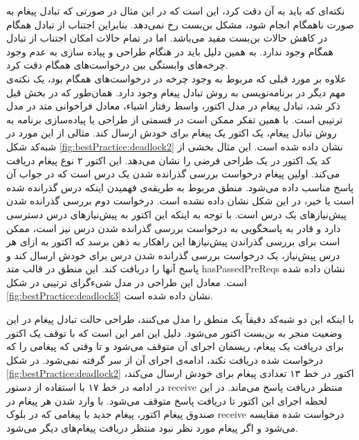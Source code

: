 \begin{enumerate}
نکته‌ای که باید به آن دقت کرد، این است که در این مثال در صورتی که تبادل پیغام به صورت ناهمگام انجام شود، مشکل بن‌بست رخ نمی‌دهد. بنابراین اجتناب از تبادل همگام در کاهش حالات بن‌بست مفید می‌باشد. اما در تمام حالات امکان اجتناب از تبادل همگام وجود ندارد. به همین دلیل باید در هنگام طراحی و پیاده سازی به عدم وجود چرخه‌های وابستگی بین درخواست‌های همگام دقت کرد. \\
علاوه بر مورد قبلی که مربوط به وجود چرخه در درخواست‌های همگام بود، یک نکته‌ی مهم دیگر در برنامه‌نویسی به روش تبادل پیغام وجود دارد. همان‌طور که در بخش قبل ذکر شد، تبادل پیغام در مدل اکتور، واسط رفتار اشیاء، معادل فراخوانی متد در مدل ترتیبی است. با همین تفکر ممکن است در قسمتی از طراحی یا پیاده‌سازی برنامه به روش تبادل پیغام، یک اکتور یک پیغام برای خودش ارسال کند. مثالی از این مورد در شبه‌کد شکل \ref{fig:bestPractice:deadlock2} نشان داده شده است.
این مثال بخشی از کد یک اکتور در یک طراحی فرضی را نشان می‌دهد. این اکتور ۲ نوع پیغام دریافت می‌کند. اولین پیغام درخواست بررسی گذرانده شدن یک درس است که در جواب آن پاسخ مناسب داده می‌شود. منطق مربوط به طریقه‌ی فهمیدن اینکه درس گذرانده شده است یا خیر، در این شکل نشان داده نشده است. درخواست دوم بررسی گذرانده شدن پیش‌نیازهای یک درس است. با توجه به اینکه این اکتور به پیش‌نیازهای درس دسترسی دارد و قادر به پاسخگویی به درخواست بررسی گذرانده شدن درس نیز است، ممکن است برای بررسی گذراندن پیش‌نیازها این راهکار به ذهن برسد که اکتور به ازای هر درس پیش‌نیاز، یک درخواست بررسی گذرانده شدن درس برای خودش ارسال کند و پاسخ آنها را دریافت کند. این منطق در قالب متد hasPassedPreReqs نشان داده شده است. معادل این طراحی در مدل شیءگرای ترتیبی در شکل \ref{fig:bestPractice:deadlock3} نشان داده شده است.
\end{enumerate}
با اینکه این دو شبه‌کد دقیقاً یک منطق را مدل می‌کنند، طراحی حالت تبادل پیغام در این وضعیت منجر به بن‌بست اکتور می‌شود. دلیل این امر این است که با توقف یک اکتور برای دریافت یک پیغام، ریسمان اجرای آن متوقف می‌شود و تا وقتی که پیغامی را که درخواست شده دریافت نکند، ادامه‌ی اجرای آن از سر گرفته نمی‌شود. در شکل \ref{fig:bestPractice:deadlock2} اکتور در خط ۱۳ تعدادی پیغام برای خودش ارسال می‌کند، در ادامه در خط ۱۷ با استفاده از دستور receive منتظر دریافت پاسخ می‌ماند. در این لحظه اجرای این اکتور تا دریافت پاسخ متوقف می‌شود. با وارد شدن هر پیغام در صندوق پیغام اکتور، پیغام جدید با پیغامی که در بلوک receive درخواست شده مقایسه می‌شود و اگر پیغام مورد نظر نبود منتظر دریافت پیغام‌های دیگر می‌شود.
